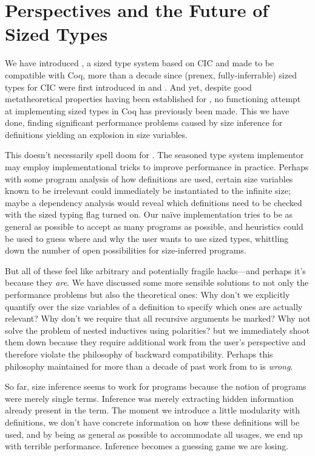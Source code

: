 \section{Perspectives and the Future of Sized Types}
\label{sec:conclusion}

We have introduced \lang, a sized type system based on CIC and made to be compatible with Coq,
more than a decade since (prenex, fully-inferrable) sized types for CIC were first introduced in \CIChat and \CIChatminus.
And yet, despite good metatheoretical properties having been established for \CIChatminus,
no functioning attempt at implementing sized types in Coq has previously been made.
This we have done, finding significant performance problems caused by size inference for definitions yielding an explosion in size variables.

This doesn't necessarily spell doom for \lang.
The seasoned type system implementor may employ implementational tricks to improve performance in practice.
Perhaps with some program analysis of how definitions are used, certain size variables known to be irrelevant could immediately be instantiated to the infinite size;
maybe a dependency analysis would reveal which definitions need to be checked with the sized typing flag turned on.
Our na\"ive implementation tries to be as general as possible to accept as many programs as possible,
and heuristics could be used to guess where and why the user wants to use sized types,
whittling down the number of open possibilities for size-inferred programs.

But all of these feel like arbitrary and potentially fragile hacks---and perhaps it's because they \emph{are}.
We have discussed some more sensible solutions to not only the performance problems but also the theoretical ones:
Why don't we explicitly quantify over the size variables of a definition to specify which ones are actually relevant?
Why don't we require that all recursive arguments be marked?
Why not solve the problem of nested inductives using polarities?
but we immediately shoot them down because they require additional work from the user's perspective and therefore violate the philosophy of backward compatibility.
Perhaps this philosophy maintained for more than a decade of past work from \lambdahat to \CIChatsub is \emph{wrong}.

So far, size inference seems to work for programs because the notion of programs were merely single terms.
Inference was merely extracting hidden information already present in the term.
The moment we introduce a little modularity with definitions,
we don't have concrete information on how these definitions will be used,
and by being as general as possible to accommodate all usages,
we end up with terrible performance.
Inference becomes a guessing game we are losing.

